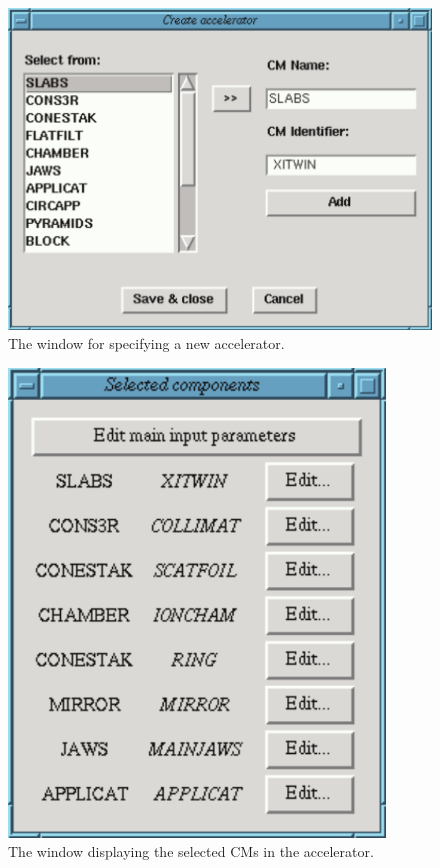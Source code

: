 \documentclass[12pt,twoside]{article}
\begin{document}
\begin{htmlonly}
\begin{figure}[htbp]
\begin{center}
    \leavevmode
    \includegraphics[width=15cm]{figures/add_cm}
\end{center}
\caption{The window for specifying a new accelerator.\label{add_cm}}
\end{figure}
\begin{figure}[htbp]
\begin{center}
    \leavevmode
    \includegraphics[width=10cm]{figures/cm_selected}
\end{center}
\caption{The window displaying the selected CMs in the accelerator.}
\end{figure}
\end{htmlonly}
\end{document}
